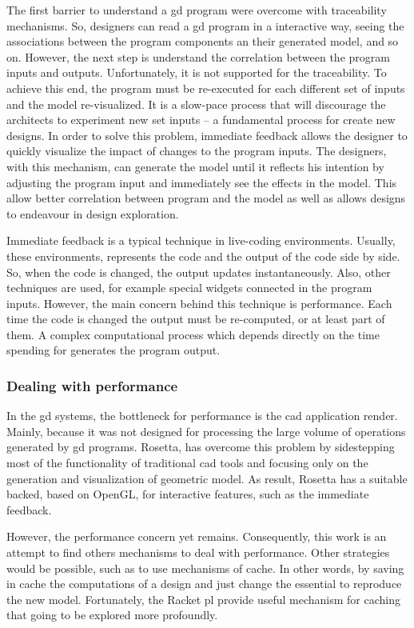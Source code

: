 The first barrier to understand a \ac{gd} program were overcome with traceability mechanisms. So, designers can read a \ac{gd} program in a interactive way, seeing the associations between the program components an their generated model, and so on. However, the next step is understand the correlation between the program inputs and outputs. Unfortunately, it is not supported for the traceability. To achieve this end, the program must be re-executed for each different set of inputs and the model re-visualized. It is a slow-pace process that will discourage the architects to experiment new set inputs -- a fundamental process for create new designs. In order to solve this problem, immediate feedback allows the designer to quickly visualize the impact of changes to the program inputs. The designers, with this mechanism, can generate the model until it reflects his intention by adjusting the program input and immediately see the effects in the model. This allow better correlation between program and the model as well as allows designs to endeavour in design exploration.

Immediate feedback is a typical technique in live-coding environments. Usually, these environments, represents the code and the output of the code side by side. So, when the code is changed, the output updates instantaneously. Also, other techniques are used, for example special widgets connected in the program inputs. However, the main concern behind this technique is performance. Each time the code is changed the output must be re-computed, or at least part of them. A complex computational process which depends directly on the time spending for generates the program output.

\subsubsection{Dealing with performance}

In the \ac{gd} systems, the bottleneck for performance is the \ac{cad} application render. Mainly, because it was not designed for processing the large volume of operations generated by \ac{gd} programs. Rosetta, has overcome this problem by sidestepping most of the functionality of traditional \ac{cad} tools and focusing only on the generation and visualization of geometric model. As result, Rosetta has a suitable backed, based on OpenGL, for interactive features, such as the immediate feedback.

However, the performance concern yet remains. Consequently, this work is an attempt to find others mechanisms to deal with performance. Other strategies would be possible, such as to use mechanisms of cache. In other words, by saving in cache the computations of a design and just change the essential to reproduce the new model. Fortunately, the Racket \ac{pl} provide useful mechanism for caching that going to be explored more profoundly.

